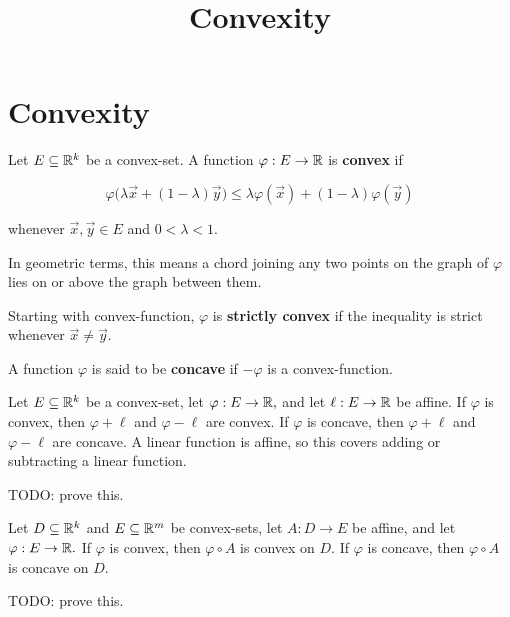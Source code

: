 \documentclass{article}
\title{Convexity}
\begin{document}
\section{Convexity}
\begin{definition}
Let $E \subseteq \mathbb{R}^k$ be a \@{convex-set}. A function $\varphi : E \to \mathbb{R}$ is \textbf{convex} if

\[ \varphi\big(\lambda \vec{x} + (1 - \lambda) \vec{y}\big) \leq \lambda \varphi(\vec{x}) + (1 - \lambda)\varphi(\vec{y}) \]

whenever $\vec{x}, \vec{y} \in E$ and $0 < \lambda < 1.$

In geometric terms, this means a \@{chord} joining any two points on the graph of $\varphi$ lies on or above the graph between them.
\end{definition}

\begin{definition}
Starting with \@{convex-function}, $\varphi$ is \textbf{strictly convex} if the inequality is strict whenever $\vec{x} \neq \vec{y}.$
\end{definition}

\begin{definition}
A function $\varphi$ is said to be \textbf{concave} if $-\varphi$ is a \@{convex-function}.
\end{definition}

\begin{theorem}
Let $E \subseteq \mathbb{R}^k$ be a \@{convex-set}, let $\varphi : E \to \mathbb{R},$ and let $\ell : E \to \mathbb{R}$ be \@{affine}. If $\varphi$ is \@{convex}, then $\varphi + \ell$ and $\varphi - \ell$ are convex. If $\varphi$ is \@{concave}, then $\varphi + \ell$ and $\varphi - \ell$ are concave. A linear function is affine, so this covers adding or subtracting a linear function.

TODO: prove this.
\end{theorem}

\begin{theorem}
Let $D \subseteq \mathbb{R}^k$ and $E \subseteq \mathbb{R}^m$ be \@{convex-set}s, let $A : D \to E$ be \@{affine}, and let $\varphi : E \to \mathbb{R}.$ If $\varphi$ is \@{convex}, then $\varphi \circ A$ is convex on $D.$ If $\varphi$ is \@{concave}, then $\varphi \circ A$ is concave on $D.$

TODO: prove this.
\end{theorem}
\end{document}
